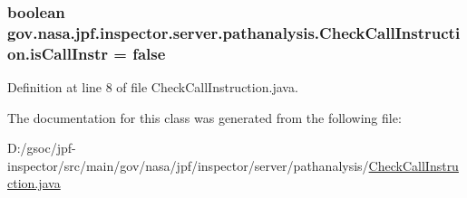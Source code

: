 \subsubsection[{\texorpdfstring{is\+Call\+Instr}{isCallInstr}}]{\setlength{\rightskip}{0pt plus 5cm}boolean gov.\+nasa.\+jpf.\+inspector.\+server.\+pathanalysis.\+Check\+Call\+Instruction.\+is\+Call\+Instr = false\hspace{0.3cm}{\ttfamily [private]}}\hypertarget{classgov_1_1nasa_1_1jpf_1_1inspector_1_1server_1_1pathanalysis_1_1_check_call_instruction_a925aecab303dc7fbf7a0011c10787764}{}\label{classgov_1_1nasa_1_1jpf_1_1inspector_1_1server_1_1pathanalysis_1_1_check_call_instruction_a925aecab303dc7fbf7a0011c10787764}


Definition at line 8 of file Check\+Call\+Instruction.\+java.



The documentation for this class was generated from the following file\+:\begin{DoxyCompactItemize}
\item 
D\+:/gsoc/jpf-\/inspector/src/main/gov/nasa/jpf/inspector/server/pathanalysis/\hyperlink{_check_call_instruction_8java}{Check\+Call\+Instruction.\+java}\end{DoxyCompactItemize}
